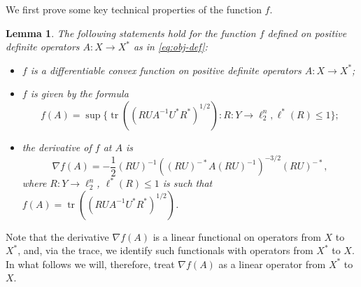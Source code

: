 \documentclass[11pt]{article}
\newtheorem{lemma}{Lemma}
\DeclareMathOperator{\tr}{tr}
\begin{document}
We first prove some key technical properties of the function $f$.
\begin{lemma}\label{lm:obj-f}
  The following statements hold for the function $f$ defined on
  positive definite operators $A:X \to X^*$ as in \eqref{eq:obj-def}:
 \begin{itemize}
  \item $f$ is a differentiable convex function on positive definite
    operators $A:X \to X^*$;
  \item $f$ is given by the formula
    \begin{equation}\label{eq:f-formula}
    f(A) = \sup\{\tr((RUA^{-1}U^*R^*)^{1/2}): 
    R: Y \to \ell_2^n, \ell^*(R) \le 1\};
    \end{equation}
  \item the derivative of $f$ at $A$ is 
    \begin{equation}\label{eq:f-derivative}
    \nabla f(A) = 
    -\frac{1}{2} (RU)^{-1} ((RU)^{-*} A (RU)^{-1})^{-3/2} (RU)^{-*},
    \end{equation}
    where $R: Y \to \ell_2^n$, $\ell^*(R) \le 1$ is such that $f(A) = 
    \tr((RUA^{-1}U^*R^*)^{1/2})$.
  \end{itemize}
\end{lemma}
Note that the derivative $\nabla f(A)$ is a linear functional on
operators from $X$ to $X^*$, and, via the trace, we identify such functionals with
operators from $X^*$ to $X$. In what follows we will, therefore, treat $\nabla
f(A)$ as a linear operator from $X^*$ to $X$.
\end{document}
